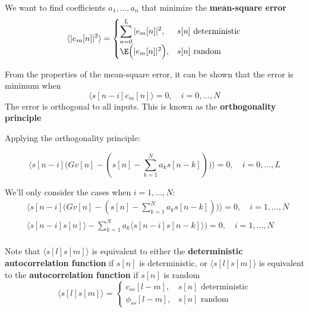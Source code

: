 \documentclass[10pt, aspectratio=169]{beamer}
\begin{document}
\begin{frame}
We want to find coefficients $a_1, \ldots, a_n$ that minimize the \textbf{mean-square error}
\begin{equation*}
\langle |e_m[n]|^2 \rangle = \begin{cases}
\displaystyle\sum_{n =0}^{L} |e_m[n]|^2, & \text{$s[n]$ deterministic} \\
\E\Big(|e_m[n]|^2\Big), & \text{$s[n]$ random}
\end{cases}
\end{equation*}

From the properties of the mean-square error, it can be shown that the error is minimum when
\begin{equation*}
\langle s[n-i]e_m[n] \rangle = 0,  \quad i = 0, \ldots, N
\end{equation*}
The error is orthogonal to all inputs. This is known as the \textbf{orthogonality principle}
\end{frame}

%
\begin{frame}
Applying the orthogonality principle:

\begin{equation*}
\Big\langle s[n-i] \Big(Gv[n] - (s[n] - \sum_{k = 1}^N a_ks[n-k])\Big) \Big\rangle  = 0, \quad i = 0, \ldots, L
\end{equation*}

We'll only consider the cases when $i = 1, \ldots, N$:
\begin{align*}
	&\Big\langle s[n-i] \Big(Gv[n] - (s[n] - \sum_{k = 1}^N a_ks[n-k])\Big) \Big\rangle  = 0, \quad i = 1, \ldots, N \\
	&\langle s[n-i]s[n]\rangle - \sum_{k = 1}^N a_k\langle s[n-i]s[n-k]\rangle)  = 0, \quad i = 1, \ldots, N \tag{from causality $\langle s[n-i]v[n]\rangle = 0$}\\
\end{align*}

Note that $\langle s[l]s[m]\rangle$ is equivalent to either the \textbf{deterministic autocorrelation function} if $s[n]$ is deterministic, or $\langle s[l]s[m]\rangle$  is equivalent to the \textbf{autocorrelation function} if $s[n]$ is random
\begin{equation*}
	\langle s[l]s[m]\rangle = \begin{cases}
	c_{ss}[l-m], & \text{$s[n]$ deterministic} \\
	\phi_{ss}[l-m], & \text{$s[n]$ random}
	\end{cases}
\end{equation*}

\end{frame}
\end{document}
